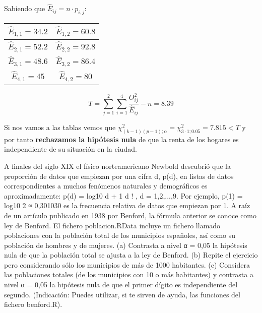 \begin{problem}[8]
Sabiendo que $\hat{E}_{ij} = n·p_{i,j}$:

\begin{center}
	\begin{tabular}{c | c}
		$\hat{E}_{1,1} = 34.2$ & $\hat{E}_{1,2} = 60.8$\\ \hline
		$\hat{E}_{2,1} = 52.2$ & $\hat{E}_{2,2} = 92.8$\\ \hline
		$\hat{E}_{3,1} = 48.6$ & $\hat{E}_{3,2} = 86.4$\\ \hline
		$\hat{E}_{4,1} = 45$ & $\hat{E}_{4,2} = 80$
	\end{tabular}
\end{center}

\[T=\sum_{j=1}^2 \sum_{i=1}^4 \frac{O_{ij}^2}{\hat{E}_{ij}} - n = 8.39\]

Si nos vamos a las tablas vemos que $χ^2_{(k-1)(p-1); α} = χ^2_{3·1; 0.05} = 7.815 < T$ y por tanto \textbf{rechazamos la hipótesis nula} de que la renta de los hogares es independiente de su situación en la ciudad.


\end{problem}
\begin{problem}[9] A finales del siglo XIX el físico norteamericano Newbold descubrió que la proporción de datos
que empiezan por una cifra d, p(d), en listas de datos correspondientes a muchos fenómenos
naturales y demográficos es aproximadamente:
p(d) = log10
d + 1
d
!
, d = 1,2,...,9.
Por ejemplo, p(1) = log10 2 ≈ 0,301030 es la frecuencia relativa de datos que empiezan por 1. A raíz
de un artículo publicado en 1938 por Benford, la fórmula anterior se conoce como ley de Benford.
El fichero poblacion.RData incluye un fichero llamado poblaciones con la población total de los
municipios españoles, así como su población de hombres y de mujeres.
(a) Contrasta a nivel α = 0,05 la hipótesis nula de que la población total se ajusta a la ley de Benford.
(b) Repite el ejercicio pero considerando sólo los municipios de más de 1000 habitantes.
(c) Considera las poblaciones totales (de los municipios con 10 o más habitantes) y contrasta a nivel
α = 0,05 la hipótesis nula de que el primer dígito es independiente del segundo.
(Indicación: Puedes utilizar, si te sirven de ayuda, las funciones del fichero benford.R).
\solution

\end{problem}
